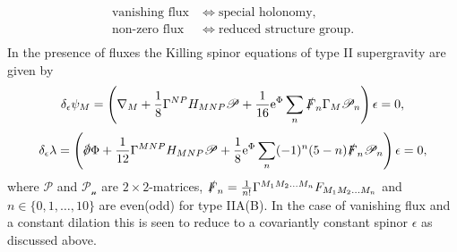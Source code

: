 \begin{align*}
    \text{vanishing flux}&\Longleftrightarrow \text{special holonomy},\\
    \text{non-zero flux}&\Longleftrightarrow \text{reduced structure group}.\\
\end{align*}
In the presence of fluxes the Killing spinor equations of type II supergravity are given by \cite{Blumenhagen2013}
\begin{equation}\label{eq:KillingSpinorWithFluxGravitino}
    \delta_\epsilon \psi_M = \left(\nabla_M+\frac{1}{8}\Gamma^{NP}H_{MNP}\mathscr{P}+\frac{1}{16}\mathrm{e}^\Phi\sum_{n}\slashed{F}_n\Gamma_M\mathscr{P}_n\right)\epsilon=0,
\end{equation}
\begin{equation}
    \delta_\epsilon \lambda = \left(\slashed{\pd}\Phi+\frac{1}{12}\Gamma^{MNP}H_{MNP}\mathscr{P}+\frac{1}{8}\ee^\Phi\sum_{n}(-1)^n(5-n)\slashed{F}_n\mathscr{P}_n\right)\epsilon=0,
\end{equation}
where $\mathscr{P}$ and $\mathscr{P_n}$ are $2\times 2$-matrices, $\slashed{F}_n=\frac{1}{n!}\Gamma^{M_1M_2\ldots M_n}F_{M_1M_2\ldots M_n}$ and $n\in\{0,1,\ldots,10\}$ are even(odd) for type IIA(B). In the case of vanishing flux and a constant dilation this is seen to reduce to a covariantly constant spinor $\epsilon$ as discussed above. 

